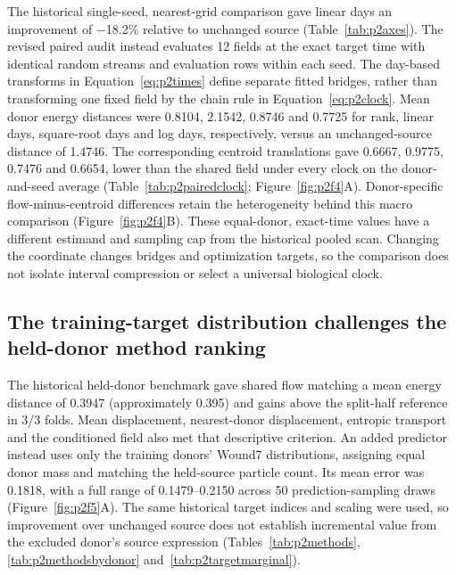 \documentclass[10pt,a4paper]{article}
\begin{document}
The historical single-seed, nearest-grid comparison gave linear days an improvement of −18.2\% relative to unchanged source (Table~\ref{tab:p2axes}). The revised paired audit instead evaluates 12 fields at the exact target time with identical random streams and evaluation rows within each seed. The day-based transforms in Equation~\eqref{eq:p2times} define separate fitted bridges, rather than transforming one fixed field by the chain rule in Equation~\eqref{eq:p2clock}. Mean donor energy distances were 0.8104, 2.1542, 0.8746 and 0.7725 for rank, linear days, square-root days and log days, respectively, versus an unchanged-source distance of 1.4746. The corresponding centroid translations gave 0.6667, 0.9775, 0.7476 and 0.6654, lower than the shared field under every clock on the donor-and-seed average (Table~\ref{tab:p2pairedclock}; Figure~\ref{fig:p2f4}A\label{call:p2f4}). Donor-specific flow-minus-centroid differences retain the heterogeneity behind this macro comparison (Figure~\ref{fig:p2f4}B). These equal-donor, exact-time values have a different estimand and sampling cap from the historical pooled scan. Changing the coordinate changes bridges and optimization targets, so the comparison does not isolate interval compression or select a universal biological clock.






\subsection{The training-target distribution challenges the held-donor method ranking}

The historical held-donor benchmark gave shared flow matching a mean energy distance of 0.3947 (approximately 0.395) and gains above the split-half reference in 3/3 folds. Mean displacement, nearest-donor displacement, entropic transport and the conditioned field also met that descriptive criterion. An added predictor instead uses only the training donors' Wound7 distributions, assigning equal donor mass and matching the held-source particle count. Its mean error was 0.1818, with a full range of 0.1479--0.2150 across 50 prediction-sampling draws (Figure~\ref{fig:p2f5}A\label{call:p2f5}). The same historical target indices and scaling were used, so improvement over unchanged source does not establish incremental value from the excluded donor's source expression (Tables~\ref{tab:p2methods}, \ref{tab:p2methodsbydonor} and~\ref{tab:p2targetmarginal}).
\end{document}
